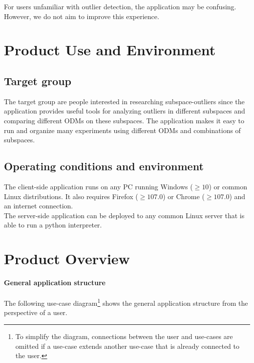 \documentclass[11pt, english]{scrartcl}
\begin{document}
For users unfamiliar with outlier detection, the application may be confusing. However, we do not aim to improve this experience.

\pagebreak


\section{Product Use and Environment}

\subsection*{Target group} \label{section:target-group}
The target group are people interested in researching \glspl{subspace-outlier} since the application provides useful tools for analyzing outliers in different subspaces and comparing different \glspl{ODM} on these subspaces. The application makes it easy to run and organize many \glspl{experiment} using different ODMs and combinations of subspaces.

\subsection*{Operating conditions and environment}
The client-side application runs on any PC running Windows ($\geq 10$) or common Linux distributions. It also requires Firefox ($\geq 107.0$) or Chrome ($\geq 107.0$) and an internet connection.\\
The server-side application can be deployed to any common Linux server that is able to run a \gls{python} interpreter.
\pagebreak


\section{Product Overview}

\paragraph{General application structure}
The following use-case diagram\footnote{To simplify the diagram, connections between the user and use-cases are omitted if a use-case extends another use-case that is already connected to the user.} shows the general application structure from the perspective of a user.
\end{document}
